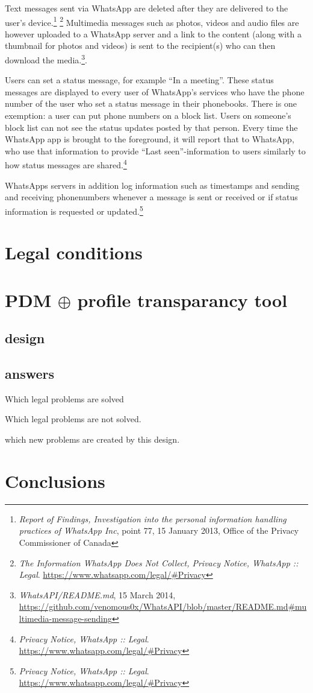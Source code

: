 \documentclass{article}
\begin{document}
Text messages sent via WhatsApp are deleted after they are delivered to the user's device.\footnote{\emph{Report of Findings, Investigation into the personal information handling practices of WhatsApp Inc}, point 77, 15 January 2013, Office of the Privacy Commissioner of Canada} \footnote{\emph{The Information WhatsApp Does Not Collect, Privacy Notice, WhatsApp :: Legal}. \url{https://www.whatsapp.com/legal/\#Privacy}} Multimedia messages such as photos, videos and audio files are however uploaded to a WhatsApp server and a link to the content (along with a thumbnail for photos and videos) is sent to the recipient(s) who can then download the media.\footnote{\emph{WhatsAPI/README.md}, 15 March 2014, \url{https://github.com/venomous0x/WhatsAPI/blob/master/README.md\#multimedia-message-sending}}.

Users can set a status message, for example ``In a meeting''. These status messages are displayed to every user of WhatsApp's services who have the phone number of the user who set a status message in their phonebooks. There is one exemption: a user can put phone numbers on a block list. Users on someone's block list can not see the status updates posted by that person. Every time the WhatsApp app is brought to the foreground, it will report that to WhatsApp, who use that information to provide ``Last seen''-information to users similarly to how status messages are shared.\footnote{\emph{Privacy Notice, WhatsApp :: Legal}. \url{https://www.whatsapp.com/legal/\#Privacy}}

WhatsApps servers in addition log information such as timestamps and sending and receiving phonenumbers whenever a message is sent or received or if status information is requested or updated.\footnote{\emph{Privacy Notice, WhatsApp :: Legal}. \url{https://www.whatsapp.com/legal/\#Privacy}}

\section{Legal conditions}



\section{PDM $\oplus$ profile transparancy tool}

\subsection{design}

\subsection{answers}

Which legal problems are solved

Which legal problems are not solved.

which new problems are created by this design.

\section{Conclusions}
\end{document}
